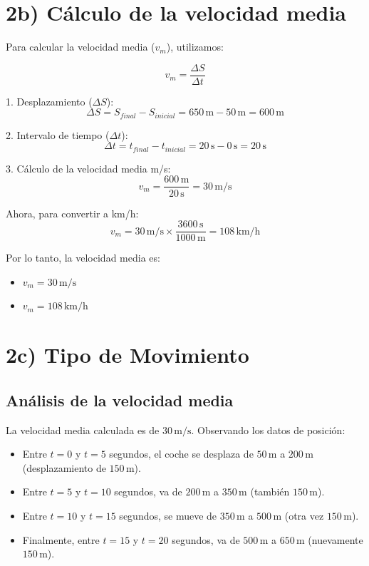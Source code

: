 \documentclass{article}
\begin{document}

\section*{2b) Cálculo de la velocidad media}

Para calcular la velocidad media (\(v_m\)), utilizamos:

\[
v_m = \frac{\Delta S}{\Delta t}
\]

1. Desplazamiento (\(\Delta S\)):
   \[
   \Delta S = S_{final} - S_{inicial} = 650 \, \text{m} - 50 \, \text{m} = 600 \, \text{m}
   \]

2. Intervalo de tiempo (\(\Delta t\)):
   \[
   \Delta t = t_{final} - t_{inicial} = 20 \, \text{s} - 0 \, \text{s} = 20 \, \text{s}
   \]

3. Cálculo de la velocidad media m/s:
\[
v_m = \frac{600 \, \text{m}}{20 \, \text{s}} = \boxed{30 \, \text{m/s}}
\]

Ahora, para convertir a km/h:
\[
v_m = 30 \, \text{m/s} \times \frac{3600 \, \text{s}}{1000 \, \text{m}} = \boxed{108 \, \text{km/h}}
\]

Por lo tanto, la velocidad media es:

\begin{itemize}
    \item \(v_m = 30 \, \text{m/s}\)
    \item \(v_m = 108 \, \text{km/h}\)
\end{itemize}


\section*{2c) Tipo de Movimiento}

\subsection*{Análisis de la velocidad media}

La velocidad media calculada es de \(30 \, \text{m/s}\). Observando los datos de posición:

\begin{itemize}
    \item Entre \(t = 0\) y \(t = 5\) segundos, el coche se desplaza de \(50 \, \text{m}\) a \(200 \, \text{m}\) (desplazamiento de \(150 \, \text{m}\)).
    \item Entre \(t = 5\) y \(t = 10\) segundos, va de \(200 \, \text{m}\) a \(350 \, \text{m}\) (también \(150 \, \text{m}\)).
    \item Entre \(t = 10\) y \(t = 15\) segundos, se mueve de \(350 \, \text{m}\) a \(500 \, \text{m}\) (otra vez \(150 \, \text{m}\)).
    \item Finalmente, entre \(t = 15\) y \(t = 20\) segundos, va de \(500 \, \text{m}\) a \(650 \, \text{m}\) (nuevamente \(150 \, \text{m}\)).
\end{itemize}
\end{document}
